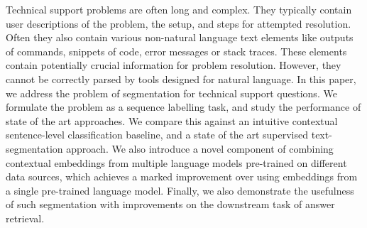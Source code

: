 Technical support problems are often long and complex. They typically contain user descriptions of the problem, the setup, and steps for attempted resolution. Often they also contain various non-natural language text elements like outputs of commands, snippets of code, error messages or stack traces. These elements contain potentially crucial information for problem resolution. However, they cannot be correctly parsed by tools designed for natural language. In this paper, we address the problem of segmentation for technical support questions. We formulate the problem as a sequence labelling task, and study the performance of state of the art approaches. We compare this against an intuitive contextual sentence-level classification baseline, and a state of the art supervised text-segmentation approach. We also introduce a novel component of combining contextual embeddings from multiple language models pre-trained on different data sources, which achieves a marked improvement over using embeddings from a single pre-trained language model. Finally, we also demonstrate the usefulness of such segmentation with improvements on the downstream task of answer retrieval.
